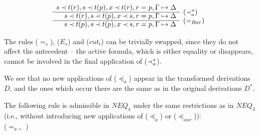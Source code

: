 \begin{PROOF}
\begin{LS}
\[%
 \begin{array}{rl}
s\Incl t(r), s\Incl t(p), x\Incl t(r), r=p, \GSD \\ \cline{1-1}
s\Incl t(r), s\Incl t(p), x\Incl s, r=p, \GSD & \rabove{(\Incl_a^*)} \\ \cline{1-1}
s\Incl t(p), s\Incl t(p), x\Incl s, r=p, \GSD & \rabove{(=_{Rar})} \end{array} \]
%
\item The rules ($=_s$), ($E_s$) and ($cut_t$) can be trivially swapped, since they do
not affect the antecedent -- the active formula, which is either equality or
disappears, cannot be involved in the final application of ($\mathbin{\prec}_a^*$).
\end{LS}
We see that no new applications of ($\preceq_a$) appear in the transformed derivations 
$D$, and the ones which occur there are the same as in the original derivations $D^*$.
\end{PROOF}
%
%
\begin{LEMMA}\label{le:asinNEQ3}
The following rule is admissible in $NEQ_4$ under the same restrictions
as in $NEQ_3$ (i.e., without introducing new applications of ($\preceq_a$) or
($\preceq_{anr}$)): \\[1ex]
\hspace*{3em}
 ($=_{a=}$) \\[3ex]
\end{LEMMA}
